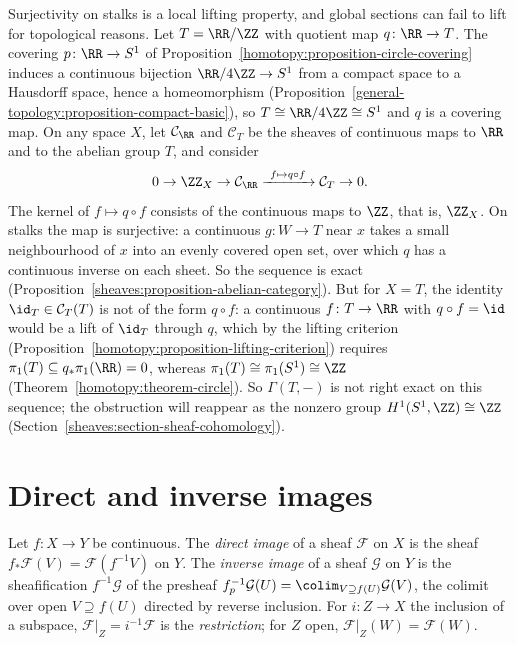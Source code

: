 \begin{counterexample}\label{sheaves:counterexample-lifting}
Surjectivity on stalks is a local lifting property, and global sections can fail to lift for topological reasons. Let $T = \RR/\ZZ$ with quotient map $q \colon \RR \to T$. The covering
$p \colon \RR \to S^1$ of Proposition~\ref{homotopy:proposition-circle-covering} induces a continuous bijection $\RR/4\ZZ \to S^1$ from a compact space to a Hausdorff space, hence a homeomorphism
(Proposition~\ref{general-topology:proposition-compact-basic}), so $T \cong \RR/4\ZZ \cong S^1$ and $q$ is a covering map. On any space $X$, let $\mathcal{C}_\RR$ and $\mathcal{C}_T$ be the sheaves of continuous maps
to $\RR$ and to the abelian group $T$, and consider
\[
0 \to \ZZ_X \to \mathcal{C}_\RR \xrightarrow{\ f \mapsto q \circ f\ } \mathcal{C}_T \to 0 .
\]
The kernel of $f \mapsto q \circ f$ consists of the continuous maps to $\ZZ$, that is, $\ZZ_X$. On stalks the map is surjective: a continuous $g \colon W \to T$ near $x$ takes a small neighbourhood of $x$ into an evenly covered
open set, over which $q$ has a continuous inverse on each sheet. So the sequence is exact (Proposition~\ref{sheaves:proposition-abelian-category}). But for $X = T$, the identity $\id_T \in \mathcal{C}_T(T)$ is not
of the form $q \circ f$: a continuous $f \colon T \to \RR$ with $q \circ f = \id$ would be a lift of $\id_T$ through $q$, which by the lifting criterion (Proposition~\ref{homotopy:proposition-lifting-criterion})
requires $\pi_1(T) \subseteq q_*\pi_1(\RR) = 0$, whereas $\pi_1(T) \cong \pi_1(S^1) \cong \ZZ$ (Theorem~\ref{homotopy:theorem-circle}). So $\Gamma(T, -)$ is not right exact on this sequence; the obstruction
will reappear as the nonzero group $H^1(S^1, \ZZ) \cong \ZZ$ (Section~\ref{sheaves:section-sheaf-cohomology}).
\end{counterexample}

\section{Direct and inverse images}\label{sheaves:section-images}

\begin{definition}\label{sheaves:definition-images}
Let $f \colon X \to Y$ be continuous. The \emph{direct image} of a sheaf $\mathcal{F}$ on $X$ is the sheaf $f_*\mathcal{F}(V) = \mathcal{F}(f^{-1}V)$ on $Y$. The \emph{inverse image} of a sheaf
$\mathcal{G}$ on $Y$ is the sheafification $f^{-1}\mathcal{G}$ of the presheaf $f^{-1}_p\mathcal{G}(U) = \colim_{V \supseteq f(U)}\mathcal{G}(V)$, the colimit over open $V \supseteq f(U)$
directed by reverse inclusion. For $i \colon Z \to X$ the inclusion of a subspace, $\mathcal{F}|_Z = i^{-1}\mathcal{F}$ is the \emph{restriction}; for $Z$ open,
$\mathcal{F}|_Z(W) = \mathcal{F}(W)$.
\end{definition}


